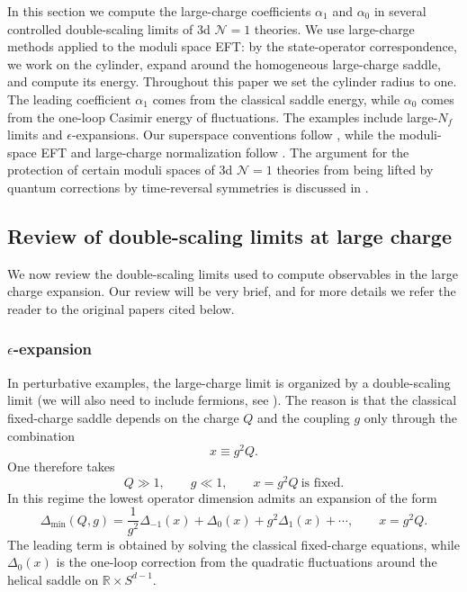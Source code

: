 \documentclass[a4paper,11pt]{article}
\newcommand\Dm{\Delta_{\min}}
\begin{document}
In this section we compute the large-charge coefficients $\alpha_1$ and $\alpha_0$ in several controlled double-scaling limits of 3d $\mathcal N=1$ theories. We use large-charge methods applied to the moduli space EFT: by the state-operator correspondence, we work on the cylinder, expand around the homogeneous large-charge saddle, and compute its energy. Throughout this paper we set the cylinder radius to one. The leading coefficient $\alpha_1$ comes from the classical saddle energy, while $\alpha_0$ comes from the one-loop Casimir energy of fluctuations. The examples include large-$N_f$ limits and $\epsilon$-expansions. Our superspace conventions follow \cite{Gates:1983nr}, while the moduli-space EFT and large-charge normalization follow \cite{Cuomo:2024fuy}. The argument for the protection of certain moduli spaces of 3d $\mathcal{N}=1$ theories from being lifted by quantum corrections by time-reversal symmetries is discussed in \cite{Gaiotto:2018yjh}.

\subsection{Review of double-scaling limits at large charge}

We now review the double-scaling limits used to compute observables in the large charge expansion. Our review will be very brief, and for more details we refer the reader to the original papers cited below.

\subsubsection{$\epsilon$-expansion}

In perturbative examples, the large-charge limit is organized by a double-scaling limit \cite{Arias-Tamargo:2019xld,Badel:2019khk,Watanabe:2019pdh} (we will also need to include fermions, see \cite{Sharon:2020mjs}). The reason is that the classical fixed-charge saddle depends on the charge $Q$ and the coupling $g$ only through the combination
\begin{equation}
  x\equiv g^2Q.
\end{equation}
One therefore takes
\begin{equation}
  Q\gg 1, \qquad g\ll 1, \qquad x=g^2Q\ \text{is fixed}.
\end{equation}
In this regime the lowest operator dimension admits an expansion of the form
\begin{equation}
  \Dm(Q,g) = \frac{1}{g^2}\Delta_{-1}(x) + \Delta_0(x) + g^2\Delta_1(x)+\cdots, \qquad x=g^2Q .
\end{equation}
The leading term is obtained by solving the classical fixed-charge equations, while $\Delta_0(x)$ is the one-loop correction from the quadratic fluctuations around the helical saddle on $\mathbb R\times S^{d-1}$.
\end{document}
